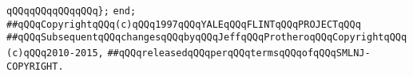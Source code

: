 \newline
\verb|qQQqqQQqqQQqqQQq};|\newline
\verb|end;|\newline
\newline
\newline
\newline
\newline
\newline
\verb|##qQQqCopyrightqQQq(c)qQQq1997qQQqYALEqQQqFLINTqQQqPROJECTqQQq|\newline
\verb|##qQQqSubsequentqQQqchangesqQQqbyqQQqJeffqQQqProtheroqQQqCopyrightqQQq(c)qQQq2010-2015,|\newline
\verb|##qQQqreleasedqQQqperqQQqtermsqQQqofqQQqSMLNJ-COPYRIGHT.|\newline

